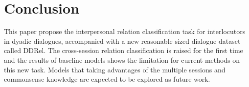 \section{Conclusion}

This paper propose the interpersonal relation classification task for interlocutors in dyadic dialogues, accompanied with a new reasonable sized dialogue dataset called DDRel. The cross-session relation classification is raised for the first time and the results of baseline models shows the limitation for current methods on this new task. Models that taking advantages of the multiple sessions and commonsense knowledge are expected to be explored as future work.